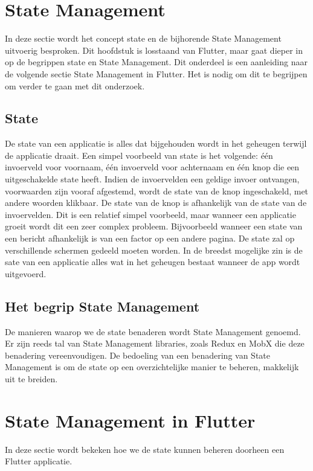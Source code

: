 \section{State Management}
In deze sectie wordt het concept state en de bijhorende State Management uitvoerig besproken. Dit hoofdstuk is losstaand van Flutter, maar gaat dieper in op de begrippen state en State Management. Dit onderdeel is een aanleiding naar de volgende sectie State Management in Flutter. Het is nodig om dit te begrijpen om verder te gaan met dit onderzoek.

\subsection{State}
De state van een applicatie is alles dat bijgehouden wordt in het geheugen terwijl de applicatie draait. \textcite{Coninck2019}
Een simpel voorbeeld van state is het volgende: één invoerveld voor voornaam, één invoerveld voor achternaam en één knop die een uitgeschakelde state heeft. Indien de invoervelden een geldige invoer ontvangen, voorwaarden zijn vooraf afgestemd, wordt de state van de knop ingeschakeld, met andere woorden klikbaar. De state van de knop is afhankelijk van de state van de invoervelden. Dit is een relatief simpel voorbeeld, maar wanneer een applicatie groeit wordt dit een zeer complex probleem. Bijvoorbeeld wanneer een state van een bericht afhankelijk is van een factor op een andere pagina. De state zal op verschillende schermen gedeeld moeten worden.
In de breedst mogelijke zin is de sate van een applicatie alles wat in het geheugen bestaat wanneer de app wordt uitgevoerd. 

\subsection{Het begrip State Management}
De manieren waarop we de state benaderen wordt State Management genoemd. Er zijn reeds tal van State Management libraries, zoals Redux en MobX die deze benadering vereenvoudigen. De bedoeling van een benadering van State Management is om de state op een overzichtelijke manier te beheren, makkelijk uit te breiden.

\section{State Management in Flutter}
In deze sectie wordt bekeken hoe we de state kunnen beheren doorheen een Flutter applicatie.

